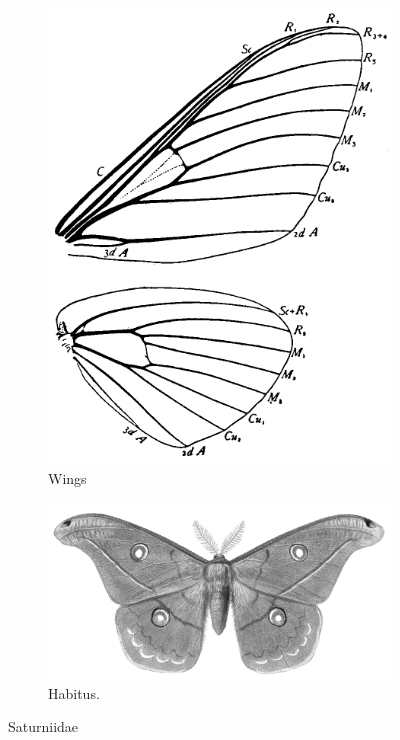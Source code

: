 \documentclass[letterpaper, 11pt]{article}
\begin{document}
\begin{figure}[ht!]
    \centering
    \begin{subfigure}[ht!]{0.31\textwidth}
        \includegraphics[width=\textwidth]{SaturniidWings}
        \caption{Wings \citep[Fig. 345]{comstock1918wings}}
        \label{fig:saturniid1}
    \end{subfigure}
    \hfill %
    \begin{subfigure}[ht!]{0.6\textwidth}
        \includegraphics[width=\textwidth]{SaturniidHabitus}
        \caption{Habitus. \citep[][Plate 19, Fig. 1]{druce1900biologia}}
        \label{fig:saturniid2}
    \end{subfigure}
    \caption{Saturniidae}\label{fig:saturniids}
\end{figure}
\end{document}
